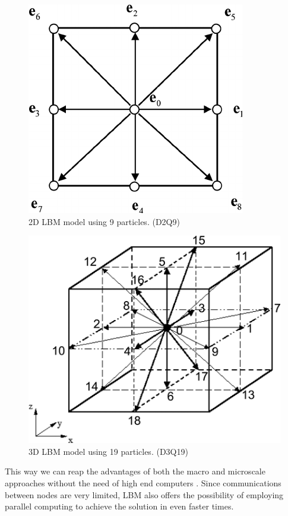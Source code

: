 \documentclass[12pt, openany]{book}
\begin{document}
\begin{figure}[H]
\centering
  \includegraphics[width=0.3\linewidth]{Resources/Images/d2q9.png}
  \caption{2D LBM model using 9 particles. (D2Q9)}
  \label{fig:d2q9}
\end{figure}

\begin{figure}[H]
\centering
  \includegraphics[width=0.3\linewidth]{Resources/Images/d3q19.png}
  \caption{3D LBM model using 19 particles. (D3Q19)}
  \label{fig:d3q19}
\end{figure}

\par
This way we can reap the advantages of both the macro and microscale approaches without the need of high end computers \cite{lbm_springer}. Since communications between nodes are very limited, LBM also offers the possibility of employing parallel computing to achieve the solution in even faster times.
\end{document}
